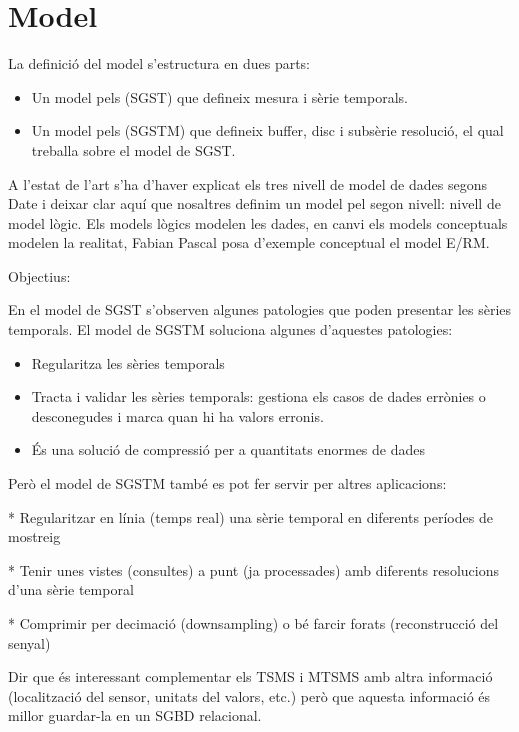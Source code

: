 
\section{Model}



La definició del model s'estructura en dues parts:

\begin{itemize}
\item Un model pels (SGST)  que defineix mesura i sèrie temporals.
\item Un model pels (SGSTM) que defineix buffer, disc i subsèrie
  resolució, el qual treballa sobre el model de SGST.
\end{itemize}

A l'estat de l'art s'ha d'haver explicat els tres nivell de model de dades segons Date i deixar clar aquí que nosaltres definim un model pel segon nivell: nivell de model lògic. Els models lògics modelen les dades, en canvi els models conceptuals modelen la realitat, Fabian Pascal posa d'exemple conceptual el model E/RM.


Objectius:

En el model de SGST s'observen algunes patologies que poden presentar les sèries temporals. El model de SGSTM soluciona algunes d'aquestes patologies:

\begin{itemize}
\item Regularitza les sèries temporals
\item Tracta i validar les sèries temporals: gestiona els casos de dades errònies o desconegudes i marca quan hi ha valors erronis.
\item És una solució de compressió per a quantitats enormes de dades
\end{itemize}


Però el model de SGSTM també es pot fer servir per altres aplicacions:

* Regularitzar en línia (temps real) una sèrie temporal en diferents períodes de mostreig

* Tenir unes vistes (consultes) a punt (ja processades) amb diferents resolucions d'una sèrie temporal

* Comprimir per decimació (downsampling) o bé farcir forats (reconstrucció del senyal)


Dir que és interessant complementar els TSMS i MTSMS amb altra informació (localització del sensor, unitats del valors, etc.) però que aquesta informació és millor guardar-la en un SGBD relacional.



